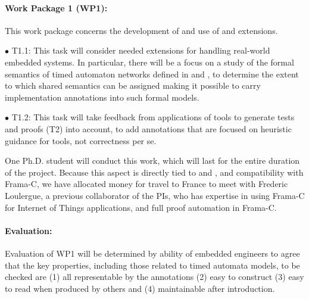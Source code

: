 \paragraph{Work Package 1 (WP1):}  This work package concerns the
development of and use of \acsl and \eacsl extensions.


$\bullet$ T1.1: This task will consider needed extensions for handling
real-world embedded systems.  In particular, there will be a focus on
a study of the formal semantics of timed
automaton networks defined in \uppaal and \prism, to determine the
extent to which shared semantics can be assigned making it possible to
carry implementation annotations into such formal models.

$\bullet$ T1.2: This task will take feedback from applications of
tools to generate tests and proofs (T2) into account, to add annotations
that are focused on heuristic guidance for tools, not correctness per se.

One Ph.D. student will conduct this work, which will last for the
entire duration of the project.  Because this aspect is directly tied
to \acsl and \eacsl, and compatibility with Frama-C, we have allocated
money for travel to France to meet with Frederic Loulergue, a previous
collaborator of the PIs, who has expertise in using Frama-C for 
Internet of Things applications, and full proof automation in Frama-C.

\paragraph{Evaluation:} Evaluation of
WP1 will be determined by ability of embedded engineers to agree that
the key properties, including those related to timed automata models, to be checked are (1) all representable by the
annotations (2) easy to construct (3) easy to read when produced by others and
(4) maintainable after introduction.

